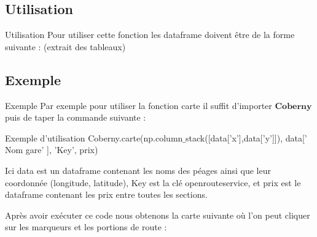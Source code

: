 \documentclass{beamer}
\begin{document}
\subsection{Utilisation}
\begin{frame}[fragile]{Utilisation}
Pour utiliser cette fonction les dataframe doivent être de la forme suivante : (extrait des tableaux) \newline
{}
\end{frame}

\subsection{Exemple}
\begin{frame}[fragile]{Exemple}
Par exemple pour utiliser la fonction carte il suffit d'importer $\textbf{Coberny}$ puis de taper la commande suivante :
\begin{block}{Exemple d'utilisation}
Coberny.carte(np.column$\_$stack([data['x'],data['y']]), data[' Nom gare' ], 'Key', prix)
\end{block}
\pause

Ici data est un dataframe contenant les noms des péages ainsi que leur coordonnée (longitude, latitude), Key est la clé openrouteservice, et prix est le dataframe contenant les prix entre toutes les sections. \newline
\pause

Après avoir exécuter ce code nous obtenons la carte suivante où l'on peut cliquer sur les marqueurs et les portions de route :
\end{frame}
\end{document}
